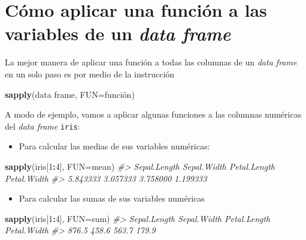 \documentclass[
]{book}
\newenvironment{Shaded}{\begin{snugshade}}{\end{snugshade}}
\newcommand{\CommentTok}[1]{\textcolor[rgb]{0.56,0.35,0.01}{\textit{#1}}}
\newcommand{\DataTypeTok}[1]{\textcolor[rgb]{0.13,0.29,0.53}{#1}}
\newcommand{\DecValTok}[1]{\textcolor[rgb]{0.00,0.00,0.81}{#1}}
\newcommand{\KeywordTok}[1]{\textcolor[rgb]{0.13,0.29,0.53}{\textbf{#1}}}
\newcommand{\NormalTok}[1]{#1}
\newcommand{\OperatorTok}[1]{\textcolor[rgb]{0.81,0.36,0.00}{\textbf{#1}}}
\providecommand{\tightlist}{%
  \setlength{\itemsep}{0pt}\setlength{\parskip}{0pt}}
\theoremstyle{definition}
\theoremstyle{definition}
\theoremstyle{definition}
\theoremstyle{remark}
\begin{document}
\hypertarget{cuxf3mo-aplicar-una-funciuxf3n-a-las-variables-de-un-data-frame}{%
\section{\texorpdfstring{Cómo aplicar una función a las variables de un \emph{data frame}}{Cómo aplicar una función a las variables de un data frame}}\label{cuxf3mo-aplicar-una-funciuxf3n-a-las-variables-de-un-data-frame}}

La mejor manera de aplicar una función a todas las columnas de un \emph{data frame} en un solo paso es por medio de la instrucción

\begin{Shaded}
\begin{Highlighting}[]
\KeywordTok{sapply}\NormalTok{(data frame, }\DataTypeTok{FUN=}\NormalTok{función)}
\end{Highlighting}
\end{Shaded}

A modo de ejemplo, vamos a aplicar algunas funciones a las columnas numéricas del \emph{data frame} \texttt{iris}:

\begin{itemize}
\tightlist
\item
  Para calcular las medias de sus variables numéricas:
\end{itemize}

\begin{Shaded}
\begin{Highlighting}[]
\KeywordTok{sapply}\NormalTok{(iris[}\DecValTok{1}\OperatorTok{:}\DecValTok{4}\NormalTok{], }\DataTypeTok{FUN=}\NormalTok{mean)}
\CommentTok{\#\textgreater{} Sepal.Length  Sepal.Width Petal.Length  Petal.Width }
\CommentTok{\#\textgreater{}     5.843333     3.057333     3.758000     1.199333}
\end{Highlighting}
\end{Shaded}

\begin{itemize}
\tightlist
\item
  Para calcular las sumas de sus variables numéricas
\end{itemize}

\begin{Shaded}
\begin{Highlighting}[]
\KeywordTok{sapply}\NormalTok{(iris[}\DecValTok{1}\OperatorTok{:}\DecValTok{4}\NormalTok{], }\DataTypeTok{FUN=}\NormalTok{sum) }
\CommentTok{\#\textgreater{} Sepal.Length  Sepal.Width Petal.Length  Petal.Width }
\CommentTok{\#\textgreater{}        876.5        458.6        563.7        179.9}
\end{Highlighting}
\end{Shaded}
\end{document}

